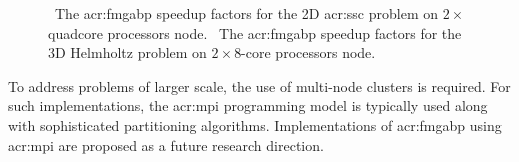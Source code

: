 \begin{figure}
	\caption[The \acrshort{acr:fmgabp} speedup factors for the 2D and 3D problems.]{\protect{}~The \acrshort{acr:fmgabp} speedup factors for the 2D \gls{acr:ssc} problem on $2\times$quadcore processors node. \protect{}~The \acrshort{acr:fmgabp} speedup factors for the 3D Helmholtz problem on $2\times$8-core processors node.}
	\label{fig:psu}
\end{figure}



To address problems of larger scale, the use of multi-node clusters is required.
For such implementations, the \gls{acr:mpi} programming model is typically used along with sophisticated partitioning algorithms.
Implementations of \gls{acr:fmgabp} using \gls{acr:mpi} are proposed as a future research direction.


